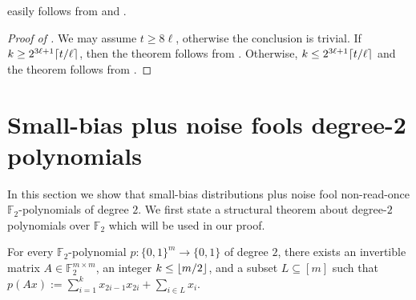 \documentclass{toc}
\newcommand{\zo}{\{0,1\}}
\def\Blocklength{\ell}
\newcommand\F{\mathbb F}
\DeclarePairedDelimiter\ceil{\lceil}{\rceil}
\DeclarePairedDelimiter\floor{\lfloor}{\rfloor}
\begin{document}
	 easily follows from  and .
  \begin{proof}[Proof of {}]
    We may assume $t \ge 8\Blocklength$, otherwise the conclusion is trivial.
    If $k \ge 2^{3\Blocklength+1} \ceil{t/\Blocklength}$, then the theorem follows from .
    Otherwise, $k \le 2^{3\Blocklength+1} \ceil{t/\Blocklength}$ and the theorem follows from .
  \end{proof}

%
%
%
%
%
%
%
%
%
%
%
%
%
%
%
%
%
%
%
%
%
%
%

  \section{Small-bias plus noise fools degree-2 polynomials} \label{sec:deg2poly}
In this section we show that small-bias distributions plus noise fool non-read-once $\F_2$-polynomials of degree $2$.
We first state a structural theorem about degree-$2$ polynomials over $\F_2$ which will be used in our proof.

\begin{theorem} \label{thm:structure-deg2}
  For every $\F_2$-polynomial $p\colon \zo^m \to \zo$ of degree $2$, there exists an invertible matrix $A \in \F_2^{m \times m}$, an integer $k \le \floor{m/2}$, and a subset $L \subseteq [m]$ such that
$p(Ax) := \sum_{i=1}^k x_{2i-1} x_{2i} + \sum_{i \in L} x_i$.
\end{theorem}
\end{document}
